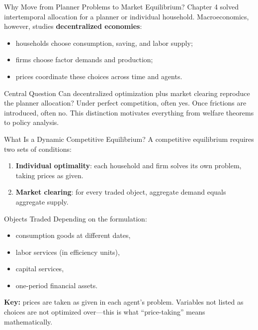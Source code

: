 \documentclass[aspectratio=169,10pt]{beamer}
\begin{document}
\begin{frame}{Why Move from Planner Problems to Market Equilibrium?}
Chapter 4 solved intertemporal allocation for a planner or individual household. Macroeconomics, however, studies \textbf{decentralized economies}:
\begin{itemize}
  \item households choose consumption, saving, and labor supply;
  \item firms choose factor demands and production;
  \item prices coordinate these choices across time and agents.
\end{itemize}

\begin{block}{Central Question}
Can decentralized optimization plus market clearing reproduce the planner allocation? Under perfect competition, often yes. Once frictions are introduced, often no. This distinction motivates everything from welfare theorems to policy analysis.
\end{block}
\end{frame}

\begin{frame}{What Is a Dynamic Competitive Equilibrium?}
A competitive equilibrium requires two sets of conditions:
\begin{enumerate}
  \item \textbf{Individual optimality}: each household and firm solves its own problem, taking prices as given.
  \item \textbf{Market clearing}: for every traded object, aggregate demand equals aggregate supply.
\end{enumerate}

\medskip
\begin{block}{Objects Traded}
Depending on the formulation:
\begin{itemize}
  \item consumption goods at different dates,
  \item labor services (in efficiency units),
  \item capital services,
  \item one-period financial assets.
\end{itemize}
\end{block}

\medskip
\textbf{Key:} prices are taken as given in each agent's problem. Variables not listed as choices are not optimized over---this is what ``price-taking'' means mathematically.
\end{frame}
\end{document}
